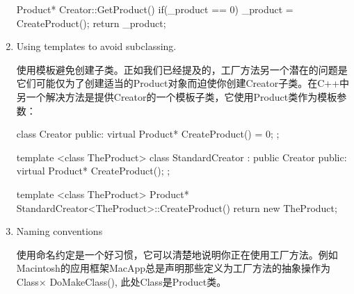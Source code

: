 \begin{enumerate}
\begin{schemedisplay}
Product* Creator::GetProduct(){
	if(_product == 0){
		_product = CreateProduct();
	}
	return _product;
}
\end{schemedisplay}

	\item Using templates to avoid subclassing.

	使用模板避免创建子类。正如我们已经提及的，工厂方法另一个潜在的问题是它们可能仅为了创建适当的Product对象而迫使你创建Creator子类。在C++中另一个解决方法是提供Creator的一个模板子类，它使用Product类作为模板参数：

\begin{schemedisplay}
class Creator{
	public:
		virtual Product* CreateProduct() = 0;
};

template <class TheProduct> class StandardCreator : public Creator{
	public:
		virtual Product* CreateProduct();
};

template <class TheProduct>
Product* StandardCreator<TheProduct>::CreateProduct(){
	return new TheProduct;
}
\end{schemedisplay}

	\item Naming conventions

	使用命名约定是一个好习惯，它可以清楚地说明你正在使用工厂方法。例如Macintosh的应用框架MacApp总是声明那些定义为工厂方法的抽象操作为Class× DoMakeClass(), 此处Class是Product类。
	
\end{enumerate}









